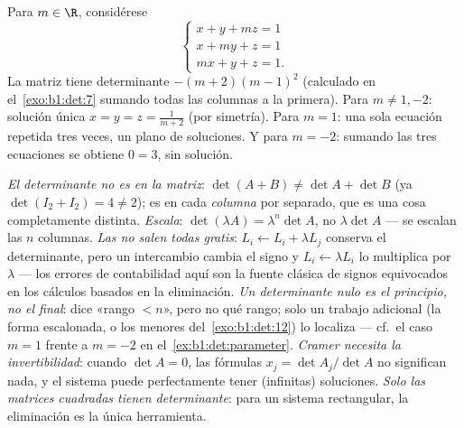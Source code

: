 \begin{example}\label{ex:b1:det:parameter}
Para $m \in \R$, considérese
\[
\begin{cases}
x + y + mz = 1\\
x + my + z = 1\\
mx + y + z = 1 .
\end{cases}
\]
La matriz tiene determinante $-(m+2)(m-1)^2$ (calculado en
el~\cref{exo:b1:det:7} sumando todas las columnas a la primera). Para
$m \neq 1, -2$: solución única $x = y = z = \frac{1}{m+2}$ (por
simetría). Para $m = 1$: una sola ecuación repetida tres veces, un
plano de soluciones. Y para $m = -2$: sumando las tres ecuaciones se
obtiene $0 = 3$, sin solución.
\end{example}

\begin{remark}
\label{rem:b1:det:pitfalls}
\emph{El determinante no es  en la matriz}:
$\det(A + B) \neq \det A + \det B$ (ya $\det(I_2 + I_2) = 4 \neq 2$);
es  en cada \emph{columna} por separado, que es una cosa
completamente distinta.
\emph{Escala}: $\det(\lambda A) = \lambda^n\det A$, no
$\lambda\det A$ --- se escalan las $n$ columnas.
\emph{Las  no salen todas gratis}:
$L_i \leftarrow L_i + \lambda L_j$ conserva el determinante, pero un
intercambio cambia el signo y $L_i \leftarrow \lambda L_i$ lo
multiplica por $\lambda$ --- los errores de contabilidad aquí son la
fuente clásica de signos equivocados en los cálculos basados en la
eliminación.
\emph{Un determinante nulo es el principio, no el final}: dice
«rango $< n$», pero no qué rango; solo un trabajo adicional (la forma
escalonada, o los menores del~\cref{exo:b1:det:12}) lo localiza ---
cf.\ el caso $m = 1$ frente a $m = -2$ en
el~\cref{ex:b1:det:parameter}.
\emph{Cramer necesita la invertibilidad}: cuando $\det A = 0$, las
fórmulas $x_j = \det A_j/\det A$ no significan nada, y el sistema
puede perfectamente tener (infinitas) soluciones.
\emph{Solo las matrices cuadradas tienen determinante}: para un
sistema rectangular, la eliminación es la única herramienta.
\end{remark}

